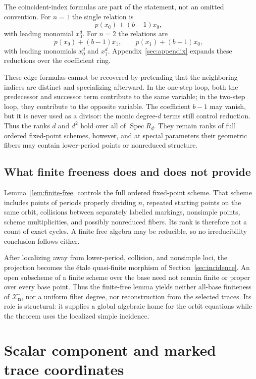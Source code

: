 \documentclass[11pt]{article}
\theoremstyle{definition}
\theoremstyle{remark}
\newcommand{\cX}{\mathcal X}
\newcommand{\bn}{\mathbf n}
\begin{document}
The coincident-index formulas are part of the statement, not an omitted
convention.  For $n=1$ the single relation is
\[
  p(x_0)+(b-1)x_0,
\]
with leading monomial $x_0^d$.  For $n=2$ the relations are
\[
  p(x_0)+(b-1)x_1,
  \qquad
  p(x_1)+(b-1)x_0,
\]
with leading monomials $x_0^d$ and $x_1^d$.  Appendix~\ref{sec:appendix}
expands these reductions over the coefficient ring.

These edge formulas cannot be recovered by pretending that the neighboring
indices are distinct and specializing afterward.  In the one-step loop,
both the predecessor and successor term contribute to the same variable;
in the two-step loop, they contribute to the opposite variable.  The
coefficient $b-1$ may vanish, but it is never used as a divisor: the monic
degree-$d$ terms still control reduction.  Thus the ranks $d$ and $d^2$
hold over all of $\operatorname{Spec}R_d$.  They remain ranks of full
ordered fixed-point schemes, however, and at special parameters their
geometric fibers may contain lower-period points or nonreduced structure.

\subsection{What finite freeness does and does not provide}

Lemma~\ref{lem:finite-free} controls the full ordered fixed-point scheme.
That scheme includes points of periods properly dividing $n$, repeated
starting points on the same orbit, collisions between separately labelled
markings, nonsimple points, scheme multiplicities, and possibly nonreduced
fibers.  Its rank is therefore not a count of exact cycles.  A finite free
algebra may be reducible, so no irreducibility conclusion follows either.

After localizing away from lower-period, collision, and nonsimple loci, the
projection becomes the étale quasi-finite morphism of
Section~\ref{sec:incidence}.  An open subscheme of a finite scheme over the
base need not remain finite or proper over every base point.  Thus the
finite-free lemma yields neither all-base finiteness of
$\cX_{\bn}^{\circ}$, nor a uniform fiber degree, nor reconstruction from the
selected traces.  Its role is structural: it supplies a global algebraic
home for the orbit equations while the theorem uses the localized simple
incidence.

\section{Scalar component and marked trace coordinates}
\label{sec:scalar}
\end{document}
